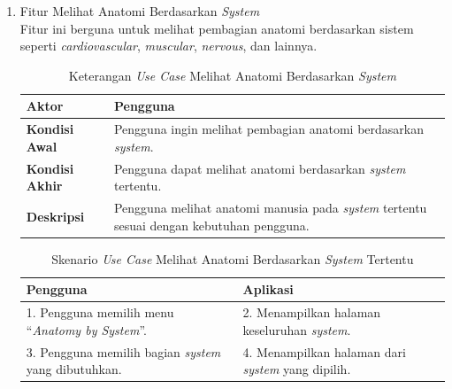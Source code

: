 \begin{enumerate}
    \item Fitur Melihat Anatomi Berdasarkan \textit{System} \\
    Fitur ini berguna untuk melihat pembagian anatomi berdasarkan sistem seperti \textit{cardiovascular}, \textit{muscular}, \textit{nervous}, dan lainnya.
    
    \begin{table}[H]
        \centering
        \caption{Keterangan \textit{Use Case} Melihat Anatomi Berdasarkan \textit{System}}
        \label{tab:keterangan_usecase_system}
        \begin{tabular}{|l|p{10cm}|}
            \hline
            \textbf{Aktor} & Pengguna \\ \hline
            \textbf{Kondisi Awal} & Pengguna ingin melihat pembagian anatomi berdasarkan \textit{system}. \\ \hline
            \textbf{Kondisi Akhir} & Pengguna dapat melihat anatomi berdasarkan \textit{system} tertentu. \\ \hline
            \textbf{Deskripsi} & Pengguna melihat anatomi manusia pada \textit{system} tertentu sesuai dengan kebutuhan pengguna. \\ \hline
        \end{tabular}
    \end{table}

    \begin{table}[H]
        \centering
        \caption{Skenario \textit{Use Case} Melihat Anatomi Berdasarkan \textit{System} Tertentu}
        \label{tab:skenario_usecase_system}
        \begin{tabular}{|p{7cm}|p{7cm}|}
            \hline
            \textbf{Pengguna} & \textbf{Aplikasi} \\ \hline
            1. Pengguna memilih menu ``\textit{Anatomy by System}''. 
            & 2. Menampilkan halaman keseluruhan \textit{system}. \\ \hline
            3. Pengguna memilih bagian \textit{system} yang dibutuhkan.
            & 4. Menampilkan halaman dari \textit{system} yang dipilih. \\ \hline
        \end{tabular}
    \end{table}

\end{enumerate}

    

         



